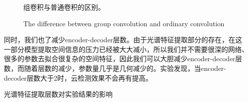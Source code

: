 \documentclass[10pt]{ctexart}
\begin{document}
\begin{multicols}{2}
\begin{figure}[H]
    \centering
    \caption[]{组卷积与普通卷积的区别。}
    \addtocounter{figure}{-1}
    \vspace{-5pt}
    \renewcommand{\figurename}{Fig}
    \caption{The difference between group convolution and ordinary convolution}
    \renewcommand{\figurename}{图}
    \label{pic:GC}
\end{figure}

同时，我们也了减少encoder-decoder层数。由于光谱特征提取部分的存在，在这一部分模型提取空间信息的压力已经被大大减小，所以我们并不需要很深的网络、很多的参数去拟合很复杂的空间特征，因此我们可以大胆减少encoder-decoder层数，而随着层数的减少，参数量几乎是几何减少的。实验发现，当encoder-decoder层数大于2时，云检测效果不会再有提高。

\begin{table}[H]
    \caption{光谱特征提取层数对实验结果的影响}
    \addtocounter{table}{-1}
    \vspace{-5pt}
    \renewcommand{\tablename}{Tab}
    \caption{Influence of the number of spectral feature extraction layers on experimental results}
    \renewcommand{\tablename}{表}
    \vspace{5pt}

    \centering
    

\end{table}
\end{multicols}
\end{document}

